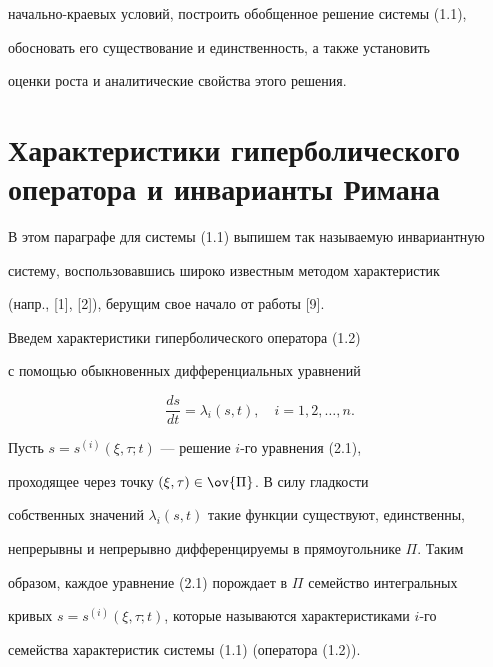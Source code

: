 начально-краевых условий, построить обобщенное решение системы (1.1), 


обосновать его существование и единственность, а также установить


оценки роста и аналитические свойства этого решения.











\section{Характеристики гиперболического оператора и инварианты Римана}





В этом параграфе для системы (1.1) выпишем так называемую инвариантную 


систему, воспользовавшись широко известным методом характеристик


(напр., [1], [2]), берущим свое начало от работы [9].





Введем характеристики гиперболического оператора (1.2) 


с помощью обыкновенных дифференциальных уравнений


\begin{equation}


\frac{ds}{dt}=\lambda_i(s,t),\quad i=1,2,\dotsc,n.


\end{equation}


Пусть $s=s^{(i)}(\xi,\tau;t)$ --- решение $i$-го уравнения (2.1), 


проходящее через точку $(\xi,\tau) \in {\ov{\Pi}}$. В силу гладкости 


собственных значений $\lambda_i(s,t)$ такие функции существуют, единственны, 


непрерывны и непрерывно дифференцируемы в прямоугольнике $\Pi$. Таким 


образом, каждое уравнение (2.1) порождает в $\Pi$ семейство интегральных 


кривых $s=s^{(i)}(\xi,\tau;t)$, которые называются характеристиками $i$-го 


семейства характеристик системы (1.1) (оператора (1.2)).






